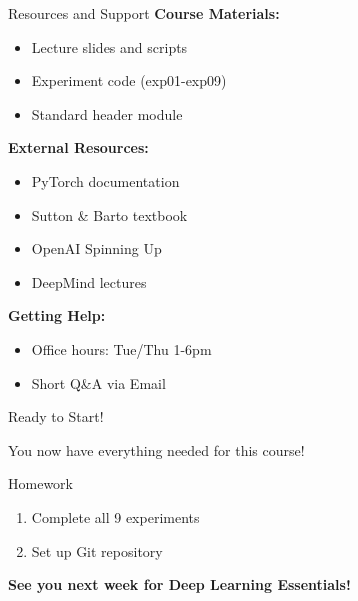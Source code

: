 \documentclass[aspectratio=169,10pt]{beamer}
\begin{document}
\begin{frame}{Resources and Support}
\textbf{Course Materials:}
\begin{itemize}
    \item Lecture slides and scripts
    \item Experiment code (exp01-exp09)
    \item Standard header module
\end{itemize}

\textbf{External Resources:}
\begin{itemize}
    \item PyTorch documentation
    \item Sutton \& Barto textbook
    \item OpenAI Spinning Up
    \item DeepMind lectures
\end{itemize}

\textbf{Getting Help:}
\begin{itemize}
    \item Office hours: Tue/Thu 1-6pm
    \item Short Q\&A via Email
\end{itemize}
\end{frame}

\begin{frame}{Ready to Start!}
\begin{center}
\Large{You now have everything needed for this course!}
\end{center}

\begin{block}{Homework}
\begin{enumerate}
    \item Complete all 9 experiments
    \item Set up Git repository
\end{enumerate}
\end{block}

\begin{center}
\textbf{See you next week for Deep Learning Essentials!}
\end{center}
\end{frame}
\end{document}
